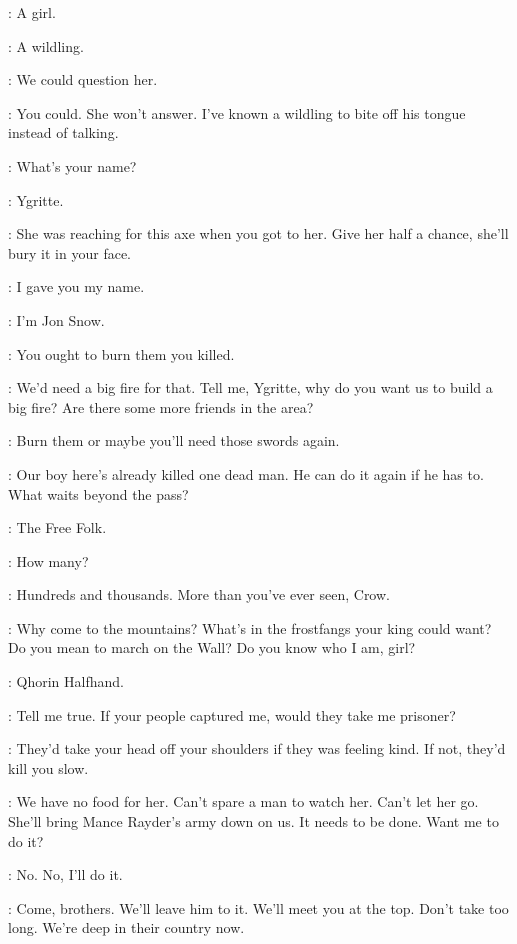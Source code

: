 
\JON: A girl. 

\HALFHAND: A wildling. 

\JON: We could question her. 

\HALFHAND: You could. She won't answer. I've known a wildling to bite off his tongue instead of talking. 

\JON: What's your name? 

\YGRITTE: Ygritte. 

\HALFHAND: She was reaching for this axe when you got to her. Give her half a chance, she'll bury it in your face. 

\YGRITTE: I gave you my name. 

\JON: I'm Jon Snow. 

\YGRITTE: You ought to burn them you killed. 

\HALFHAND: We'd need a big fire for that. Tell me, Ygritte, why do you want us to build a big fire? Are there some more friends in the area? 

\YGRITTE: Burn them or maybe you'll need those swords again. 

\HALFHAND: Our boy here's already killed one dead man. He can do it again if he has to. What waits beyond the pass? 

\YGRITTE: The Free Folk. 

\HALFHAND: How many? 

\YGRITTE: Hundreds and thousands. More than you've ever seen, Crow. 

\HALFHAND: Why come to the mountains? What's in the frostfangs your king could want? Do you mean to march on the Wall? Do you know who I am, girl? 

\YGRITTE: Qhorin Halfhand. 

\HALFHAND: Tell me true. If your people captured me, would they take me prisoner? 

\YGRITTE: They'd take your head off your shoulders if they was feeling kind. If not, they'd kill you slow. 

\HALFHAND: We have no food for her. Can't spare a man to watch her. Can't let her go. She'll bring Mance Rayder's army down on us. It needs to be done. Want me to do it? 

\JON: No. No, I'll do it. 

\HALFHAND: Come, brothers. We'll leave him to it. We'll meet you at the top. Don't take too long. We're deep in their country now. 

